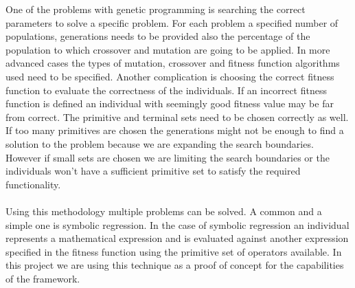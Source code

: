 One of the problems with genetic programming is searching the correct parameters to solve a specific problem. For each problem
a specified number of populations, generations needs to be provided also the percentage of the population to which crossover and
mutation are going to be applied. In more advanced cases the types of mutation, crossover and fitness function algorithms used need
to be specified. Another complication is choosing the correct fitness function to evaluate the correctness of the individuals. If 
an incorrect fitness function is defined an individual with seemingly good fitness value may be far from correct. The primitive
and terminal sets need to be chosen correctly as well. If too many primitives are chosen the generations might not be enough to 
find a solution to the problem because we are expanding the search boundaries. However if small sets are chosen we are 
limiting the search boundaries or the individuals won't have a sufficient primitive set to satisfy the required functionality.
\paragraph{}
Using this methodology multiple problems can be solved. A common and a simple one is symbolic regression. In the case
of symbolic regression an individual represents a mathematical expression and is evaluated against another expression
specified in the fitness function using the primitive set of operators available. In this project we are using this technique as a proof
of concept for the capabilities of the framework.